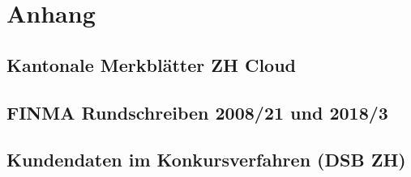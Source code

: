 \documentclass[a4paper,pointlessnumbers]{scrreprt}
\begin{document}
\chapter{Anhang}
\renewcommand{\thesection}{\Alph{section}}
\section{Kantonale Merkblätter ZH Cloud}\label{A}




\pagebreak

\section{FINMA Rundschreiben 2008/21 und 2018/3}\label{B}




\pagebreak

\section{Kundendaten im Konkursverfahren (DSB ZH)}\label{C}

\end{document}
